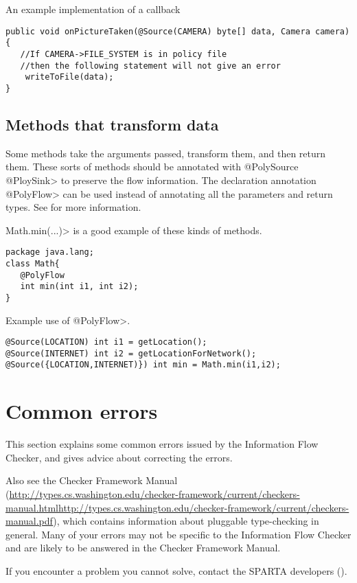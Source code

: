 An example implementation of a callback
\begin{Verbatim}
public void onPictureTaken(@Source(CAMERA) byte[] data, Camera camera){
   //If CAMERA->FILE_SYSTEM is in policy file
   //then the following statement will not give an error
    writeToFile(data);
}
\end{Verbatim}


\subsection{Methods that transform data}

Some methods take the arguments passed, transform them, and then return them.  These sorts of 
methods should be annotated with \<@PolySource @PloySink>
  to preserve the flow information.  The declaration annotation \<@PolyFlow> can be used instead of
  annotating all the parameters and return types. See  for more information. 
  
  \<Math.min(...)> is a good example of these kinds of methods. 
  
  \begin{Verbatim}
package java.lang;
class Math{
   @PolyFlow  
   int min(int i1, int i2);
}
\end{Verbatim}

Example use of \<@PolyFlow>.
\begin{Verbatim}
@Source(LOCATION) int i1 = getLocation();
@Source(INTERNET) int i2 = getLocationForNetwork();
@Source({LOCATION,INTERNET)}) int min = Math.min(i1,i2);
 \end{Verbatim}

\section{Common errors\label{errors}}

This section explains some common errors issued by the Information Flow Checker, and
gives advice about correcting the errors.   

Also see the Checker Framework Manual
(\ifhevea\url{http://types.cs.washington.edu/checker-framework/current/checkers-manual.html}\else\url{http://types.cs.washington.edu/checker-framework/current/checkers-manual.pdf}\fi),
which contains information about pluggable type-checking in general.  Many
of your errors may not be specific to the Information Flow Checker and are likely to be
answered in the Checker Framework Manual.

If you encounter a problem you cannot solve, contact the SPARTA developers ().



